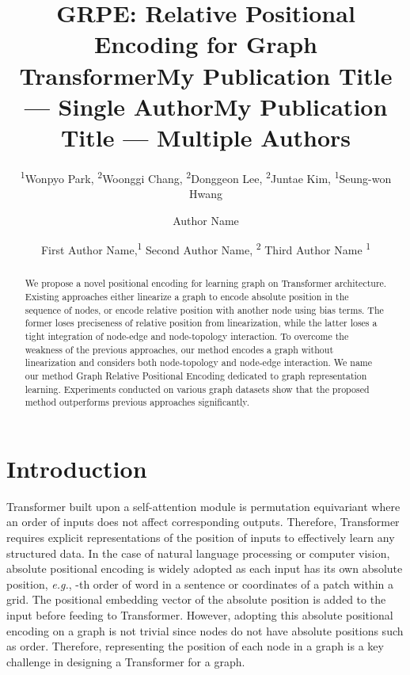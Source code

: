 \documentclass[letterpaper]{article} \usepackage{aaai23}  \usepackage{times}  \usepackage{helvet}  \usepackage{courier}  \usepackage[hyphens]{url}  \usepackage{graphicx} \urlstyle{rm} \def\UrlFont{\rm}  \usepackage{natbib}  \usepackage{caption} \frenchspacing  \setlength{\pdfpagewidth}{8.5in} \setlength{\pdfpageheight}{11in} \usepackage{algorithm}
\title{GRPE: Relative Positional Encoding for Graph Transformer}
\author{
\textsuperscript{\rm 1}Wonpyo Park\equalcontrib, \textsuperscript{\rm 2}Woonggi Chang\equalcontrib, \textsuperscript{\rm 2}Donggeon Lee, \textsuperscript{\rm 2}Juntae Kim, \textsuperscript{\rm 1}Seung-won Hwang
}
\title{My Publication Title --- Single Author}
\author {
    Author Name
}
\title{My Publication Title --- Multiple Authors}
\author {
First Author Name,\textsuperscript{\rm 1}
    Second Author Name, \textsuperscript{\rm 2}
    Third Author Name \textsuperscript{\rm 1}
}
\newcommand{\eg}{\textit{e.g.}}
\begin{document}
\maketitle
\begin{abstract}

We propose a novel positional encoding for learning graph on Transformer architecture.
Existing approaches either linearize a graph to encode absolute position in the sequence of nodes, or encode relative position with another node using bias terms.
The former loses preciseness of relative position from linearization, while the latter loses a tight integration of node-edge and node-topology interaction. 
To overcome the weakness of the previous approaches, our method encodes a graph without linearization and considers both node-topology and node-edge interaction.
We name our method Graph Relative Positional Encoding dedicated to graph representation learning.
Experiments conducted on various graph datasets show that the proposed method outperforms previous approaches significantly.
\end{abstract} \section{Introduction}
\label{sec:intro}












Transformer \cite{vaswani2017attention} built upon a self-attention module is permutation equivariant where an order of inputs does not affect corresponding outputs.
Therefore, Transformer requires explicit representations of the position of inputs to effectively learn any structured data. 
In the case of natural language processing or computer vision, absolute positional encoding is widely adopted as each input has its own absolute position, \eg, -th order of word in a sentence or coordinates of a patch within a grid.
The positional embedding vector of the absolute position is added to the input before feeding to Transformer.
However, adopting this absolute positional encoding on a graph is not trivial since nodes do not have absolute positions such as order.
Therefore, representing the position of each node in a graph is a key challenge in designing a Transformer for a graph.
\end{document}
